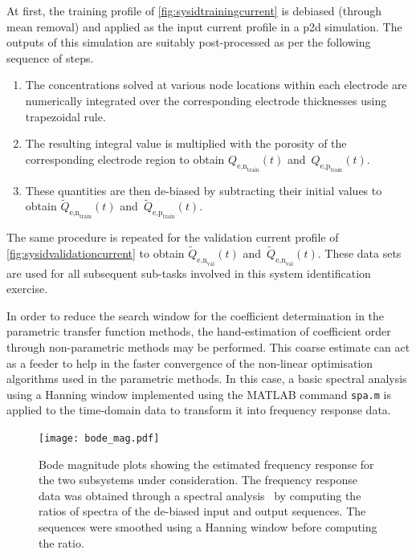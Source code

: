 At first, the training profile of \cref{fig:sysidtrainingcurrent} is
debiased (through mean removal) and applied as the input current profile in a \gls{p2d}
simulation. The outputs of this simulation are suitably post-processed as per
the following sequence of steps.
\begin{enumerate}
    \item The concentrations solved at various node locations within each
        electrode are numerically integrated over the corresponding electrode
        thicknesses using trapezoidal rule.
    \item The resulting integral value is multiplied with the porosity of the
        corresponding electrode region to obtain $Q_{\text{e,n}_\text{train}}(t)$ and~$Q_{\text{e,p}_\text{train}}(t)$.
    \item These quantities are then de-biased by subtracting their initial
        values to obtain $\widetilde{Q}_{\text{e,n}_\text{train}}(t)$ and~$\widetilde{Q}_{\text{e,p}_\text{train}}(t)$.
\end{enumerate}

The        same        procedure        is        repeated        for        the
validation       current      profile       of \cref{fig:sysidvalidationcurrent}
to         obtain         $\widetilde{Q}_{\text{e,n}_\text{val}}(t)$         and~$\widetilde{Q}_{\text{e,n}_\text{val}}(t)$.  These data  sets are  used for  all
subsequent sub-tasks involved in this system identification exercise.

In  order to  reduce  the search  window for  the  coefficient determination  in
the  parametric transfer  function methods,  the hand-estimation  of coefficient
order  through non-parametric  methods may  be performed.  This coarse  estimate
can  act as  a  feeder to  help  in  the faster  convergence  of the  non-linear
optimisation algorithms  used in the parametric  methods. In this case,  a basic
spectral analysis  using a Hanning  window implemented using the  MATLAB command
\texttt{spa.m} is applied to the time-domain data to transform it into frequency
response data.

\begin{figure}[!htbp]
    \centering
    \texttt{[image: bode\_mag.pdf]}
    \caption[Bode magnitude plots of the electrolyte time-evolution sub-systems]{%
        Bode magnitude  plots showing the  estimated frequency response  for the
        two  subsystems under  consideration.  The frequency  response data  was
        obtained  through a spectral  analysis \ie~by computing  the ratios  of
        spectra of the de-biased input  and output sequences. The sequences were
        smoothed using a Hanning window before computing the ratio.
    }%
    \label{fig:initialbodemag}
\end{figure}

